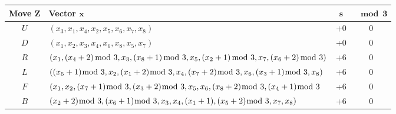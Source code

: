 \documentclass[12pt,a4paper]{article}
\theoremstyle{custom}
\begin{document}
\begin{adjustbox}{width=1\textwidth,center}
\begin{tabular}{c l c c }
\toprule

\textbf{Move} $\boldsymbol{Z}$ & \textbf{Vector} $\boldsymbol{x}$ & $\boldsymbol{s}$  & $\boldsymbol{\mod 3}$ \\

\midrule

$U$ & $(x_3, x_1,x_4,x_2,x_5,x_6,x_7,x_8)$ & +0 & 0 \\

$D$ & $(x_1,x_2,x_3,x_4,x_6,x_8,x_5,x_7)$ & +0 & 0 \\

$R$ & $(x_1,(x_4 + 2) \hspace*{-0.5em} \mod 3,x_3,(x_8 + 1) \hspace*{-0.5em} \mod 3,x_5,(x_2 +1) \hspace*{-0.5em} \mod 3,x_7,(x_6 + 2) \hspace*{-0.5em} \mod 3)$ & +6 & 0 \\

$L$ & $((x_5 + 1) \hspace*{-0.6em} \mod 3, x_2, (x_1 + 2) \hspace*{-0.6em} \mod 3, x_4, (x_7 + 2) \hspace*{-0.6em} \mod 3, x_6, (x_3 + 1) \hspace*{-0.6em} \mod 3, x_8)$ & +6 & 0 \\

$F$ & $(x_1, x_2, (x_7 +1) \hspace*{-0.6em} \mod 3, (x_3 + 2)  \hspace*{-0.6em} \mod 3, x_5, x_6, (x_8 +2)  \hspace*{-0.6em} \mod 3, (x_4 + 1) \hspace*{-0.6em} \mod 3$ & +6 & 0 \\

$B$ & $(x_2 +2) \hspace*{-0.6em} \mod 3, (x_6 + 1)  \hspace*{-0.6em} \mod 3, x_3, x_4,(x_1 + 1), (x_5 + 2)  \hspace*{-0.6em} \mod 3, x_7, x_8)$ & +6 & 0 \\

\bottomrule
\end{tabular}
\end{adjustbox}
\ \\
\end{document}
